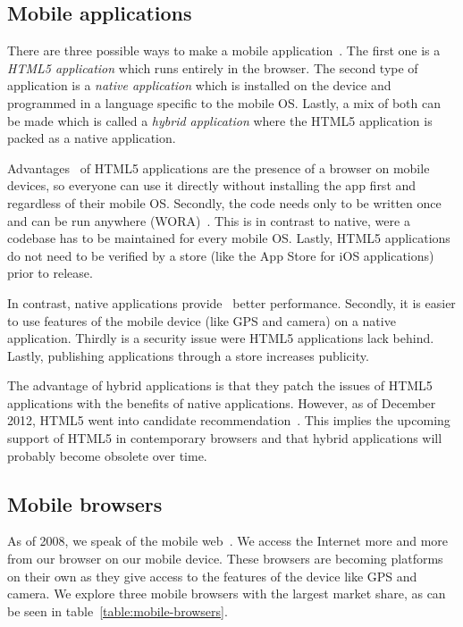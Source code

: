 \documentclass[a4paper]{artikel3}
\begin{document}
\subsection{Mobile applications}
There are three possible ways to make a mobile application~\cite{Accenture2012,Hales2012}.
The first one is a \emph{HTML5 application} which runs entirely in the browser.
The second type of application is a \emph{native application} which is installed on the device and programmed in a language specific to the mobile OS.
Lastly, a mix of both can be made which is called a \emph{hybrid application} where the HTML5 application is packed as a native application.

Advantages~\cite{Accenture2012} of HTML5 applications are the presence of a browser on mobile devices, so everyone can use it directly without installing the app first and regardless of their mobile OS.
Secondly, the code needs only to be written once and can be run anywhere (WORA)~\cite{Hales2012}.
This is in contrast to native, were a codebase has to be maintained for every mobile OS.
Lastly, HTML5 applications do not need to be verified by a store (like the App Store for iOS applications) prior to release.

In contrast, native applications provide~\cite{Accenture2012} better performance.
Secondly, it is easier to use features of the mobile device (like GPS and camera) on a native application.
Thirdly is a security issue were HTML5 applications lack behind.
Lastly, publishing applications through a store increases publicity.

The advantage of hybrid applications is that they patch the issues of HTML5 applications with the benefits of native applications.
However, as of December 2012, HTML5 went into candidate recommendation~\cite{Jacobs2012}.
This implies the upcoming support of HTML5 in contemporary browsers and that hybrid applications will probably become obsolete over time.

\subsection{Mobile browsers}
As of 2008, we speak of the mobile web~\cite{Hales2012}.
We access the Internet more and more from our browser on our mobile device.
These browsers are becoming platforms on their own as they give access to the features of the device like GPS and camera. 
We explore three mobile browsers with the largest market share, as can be seen in table~\ref{table:mobile-browsers}.
\end{document}
